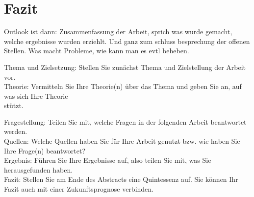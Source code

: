 \chapter{Fazit}


Outlook ist dann: Zusammenfassung der Arbeit, sprich was wurde gemacht, welche ergebnisse wurden erziehlt. Und  ganz zum schluss besprechung der offenen Stellen. Was macht Probleme, wie kann man es evtl beheben.

Thema und Zielsetzung: Stellen Sie zunächst Thema und Zielstellung der Arbeit vor.\\

Theorie: Vermitteln Sie Ihre Theorie(n) über das Thema und geben Sie an, auf was sich Ihre Theorie\\ stützt.

Fragestellung: Teilen Sie mit, welche Fragen in der folgenden Arbeit beantwortet werden.\\

Quellen: Welche Quellen haben Sie für Ihre Arbeit genutzt bzw. wie haben Sie Ihre Frage(n) beantwortet?\\

Ergebnis: Führen Sie Ihre Ergebnisse auf, also teilen Sie mit, was Sie herausgefunden haben.\\

Fazit: Stellen Sie am Ende des Abstracts eine Quintessenz auf. Sie können Ihr Fazit auch mit einer Zukunftsprognose verbinden.\\